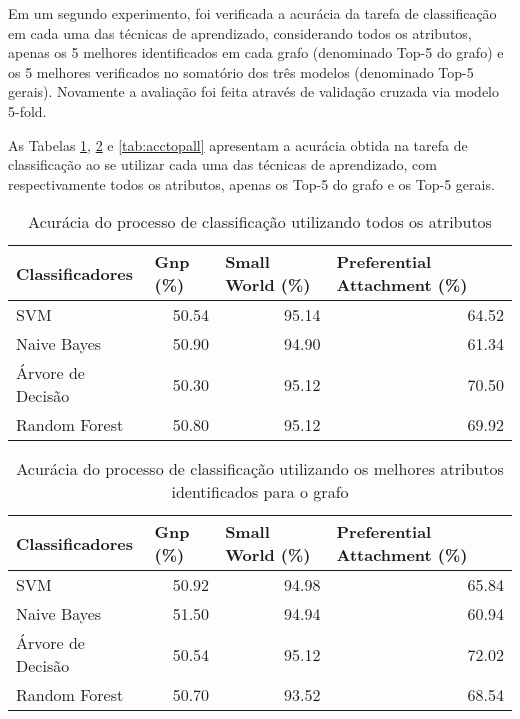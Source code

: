 \documentclass[a4paper,11pt]{article}
\begin{document}
Em um segundo experimento, foi verificada a acurácia da tarefa de classificação em cada uma das técnicas de aprendizado, considerando todos os atributos, apenas os 5 melhores identificados em cada grafo (denominado Top-5 do grafo) e os 5 melhores verificados no somatório dos três modelos (denominado Top-5 gerais). Novamente a avaliação foi feita através de validação cruzada via modelo 5-fold.

As Tabelas \ref{tab:accallattr}, \ref{tab:acctopgraph} e \ref{tab:acctopall} apresentam a acurácia obtida na tarefa de classificação ao se utilizar cada uma das técnicas de aprendizado, com respectivamente todos os atributos, apenas os Top-5 do grafo e os Top-5 gerais. 


\begin{table}[htbp]
\caption{Acurácia do processo de classificação utilizando todos os atributos}
\center
\begin{tabular}{|l|r|r|r|}
\hline 
Classificadores & \multicolumn{1}{l|}{Gnp (\%)} & \multicolumn{1}{l|}{Small World (\%)} & \multicolumn{1}{l|}{Preferential Attachment (\%)} \\ \hline \hline
SVM & 50.54 & 95.14 & 64.52 \\ \hline
Naive Bayes & 50.90 & 94.90 & 61.34 \\ \hline
Árvore de Decisão & 50.30 & 95.12 & 70.50 \\ \hline
Random Forest & 50.80 & 95.12 & 69.92 \\ \hline
\end{tabular}
\label{tab:accallattr}
\end{table}



\begin{table}[htbp]
\caption{Acurácia do processo de classificação utilizando os melhores atributos identificados para o grafo}
\center
\begin{tabular}{|l|r|r|r|}
\hline
Classificadores & \multicolumn{1}{l|}{Gnp (\%)} & \multicolumn{1}{l|}{Small World (\%)} & \multicolumn{1}{l|}{Preferential Attachment (\%)} \\ \hline \hline
SVM & 50.92 & 94.98 & 65.84 \\ \hline
Naive Bayes & 51.50 & 94.94 & 60.94 \\ \hline
Árvore de Decisão & 50.54 & 95.12 & 72.02 \\ \hline
Random Forest & 50.70 & 93.52 & 68.54 \\ \hline
\end{tabular}
\label{tab:acctopgraph}
\end{table}
\end{document}
